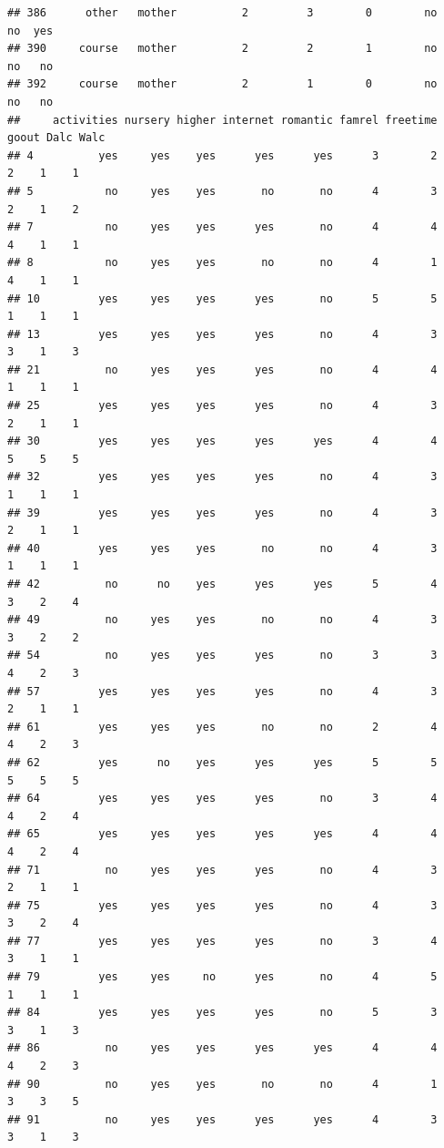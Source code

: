 \documentclass[
]{article}
\begin{document}
\begin{verbatim}
## 386      other   mother          2         3        0        no     no  yes
## 390     course   mother          2         2        1        no     no   no
## 392     course   mother          2         1        0        no     no   no
##     activities nursery higher internet romantic famrel freetime goout Dalc Walc
## 4          yes     yes    yes      yes      yes      3        2     2    1    1
## 5           no     yes    yes       no       no      4        3     2    1    2
## 7           no     yes    yes      yes       no      4        4     4    1    1
## 8           no     yes    yes       no       no      4        1     4    1    1
## 10         yes     yes    yes      yes       no      5        5     1    1    1
## 13         yes     yes    yes      yes       no      4        3     3    1    3
## 21          no     yes    yes      yes       no      4        4     1    1    1
## 25         yes     yes    yes      yes       no      4        3     2    1    1
## 30         yes     yes    yes      yes      yes      4        4     5    5    5
## 32         yes     yes    yes      yes       no      4        3     1    1    1
## 39         yes     yes    yes      yes       no      4        3     2    1    1
## 40         yes     yes    yes       no       no      4        3     1    1    1
## 42          no      no    yes      yes      yes      5        4     3    2    4
## 49          no     yes    yes       no       no      4        3     3    2    2
## 54          no     yes    yes      yes       no      3        3     4    2    3
## 57         yes     yes    yes      yes       no      4        3     2    1    1
## 61         yes     yes    yes       no       no      2        4     4    2    3
## 62         yes      no    yes      yes      yes      5        5     5    5    5
## 64         yes     yes    yes      yes       no      3        4     4    2    4
## 65         yes     yes    yes      yes      yes      4        4     4    2    4
## 71          no     yes    yes      yes       no      4        3     2    1    1
## 75         yes     yes    yes      yes       no      4        3     3    2    4
## 77         yes     yes    yes      yes       no      3        4     3    1    1
## 79         yes     yes     no      yes       no      4        5     1    1    1
## 84         yes     yes    yes      yes       no      5        3     3    1    3
## 86          no     yes    yes      yes      yes      4        4     4    2    3
## 90          no     yes    yes       no       no      4        1     3    3    5
## 91          no     yes    yes      yes      yes      4        3     3    1    3

\end{verbatim}
\end{document}
